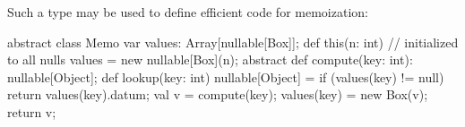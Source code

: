 Such a type may be used to define efficient code for memoization:

\begin{xten}
abstract class Memo {
  var values: Array[nullable[Box]];
  def this(n: int) {
    // initialized to all nulls
    values = new nullable[Box](n); 
  }
  abstract def compute(key: int): nullable[Object];
  def lookup(key: int) nullable[Object] = { 
   if (values(key) != null) 
     return values(key).datum;
   val v = compute(key);
   values(key) = new Box(v);
   return v;
  }
}
\end{xten}



 


